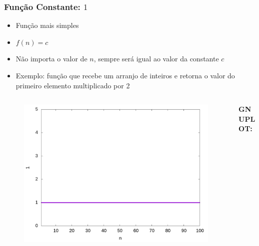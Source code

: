 \documentclass[aspectratio=169]{beamer}
\begin{document}
\begin{frame}\frametitle{Função Constante: $1$}
\begin{itemize}
	\item Função mais simples
	\item $f(n) = c$
	\item Não importa o valor de $n$, sempre será igual ao valor da constante $c$
	\item Exemplo: função que recebe um arranjo de inteiros e retorna o valor do primeiro elemento multiplicado por 2
\end{itemize}
\vspace{-5mm}
\begin{columns}[T]
\begin{column}{0.6\linewidth}
\begin{figure}[h]
	\centering
	\includegraphics[height=0.5\paperheight]{graficos/1.jpg}
\end{figure}
\end{column}
\begin{column}{0.4\linewidth}
\vspace{5mm}
{\fontsize{0}{4}\selectfont{}\textbf{GNUPLOT:}

}
\end{column}
\end{columns}
\end{frame}
\end{document}
